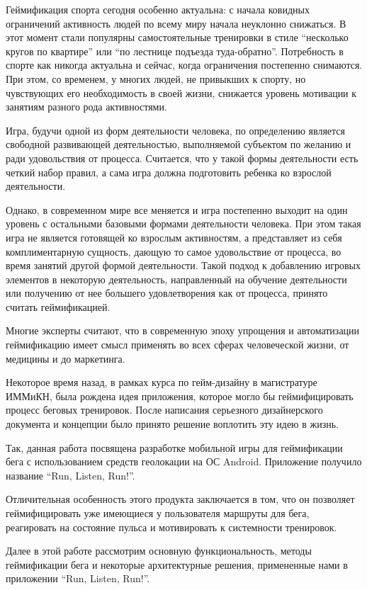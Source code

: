 \Intro

Геймификация спорта \textemdash\space сегодня особенно актуальна: с начала ковидных ограничений активность людей по всему миру начала неуклонно снижаться. В этот момент стали популярны самостоятельные тренировки в стиле ``несколько кругов по квартире'' или ``по лестнице подъезда туда-обратно''. Потребность в спорте как никогда актуальна и сейчас, когда ограничения постепенно снимаются. При этом, со временем, у многих людей, не привыкших к спорту, но чувствующих его необходимость в своей жизни, снижается уровень мотивации к занятиям разного рода активностями. 

Игра, будучи одной из форм деятельности человека, по определению является свободной развивающей деятельностью, выполняемой субъектом по желанию и ради удовольствия от процесса. Считается, что у такой формы деятельности есть четкий набор правил, а сама игра должна подготовить ребенка ко взрослой деятельности.

Однако, в современном мире все меняется и игра постепенно выходит на один уровень с остальными базовыми формами деятельности человека. При этом такая игра не является готовящей ко взрослым активностям, а представляет из себя комплиментарную сущность, дающую то самое удовольствие от процесса, во время занятий другой формой деятельности. Такой подход к добавлению игровых элементов в некоторую деятельность, направленный на обучение деятельности или получению от нее большего удовлетворения как от процесса, принято считать геймификацией.  

Многие эксперты считают, что в современную эпоху упрощения и автоматизации геймификацию имеет смысл применять во всех сферах человеческой жизни, от медицины и до маркетинга.

Некоторое время назад, в рамках курса по гейм-дизайну в магистратуре ИММиКН, была рождена идея приложения, которое могло бы геймифицировать процесс беговых тренировок. После написания серьезного дизайнерского документа и концепции было принято решение воплотить эту идею в жизнь.

Так, данная работа посвящена разработке мобильной игры для геймификации бега с использованием средств геолокации на ОС Android. Приложение получило название ``Run, Listen, Run!''.

Отличительная особенность этого продукта заключается в том, что он позволяет геймифицировать уже имеющиеся у пользователя маршруты для бега, реагировать на состояние пульса и мотивировать к системности тренировок.

Далее в этой работе рассмотрим основную функциональность, методы геймификации бега и некоторые архитектурные решения, примененные нами в приложении ``Run, Listen, Run!''.


